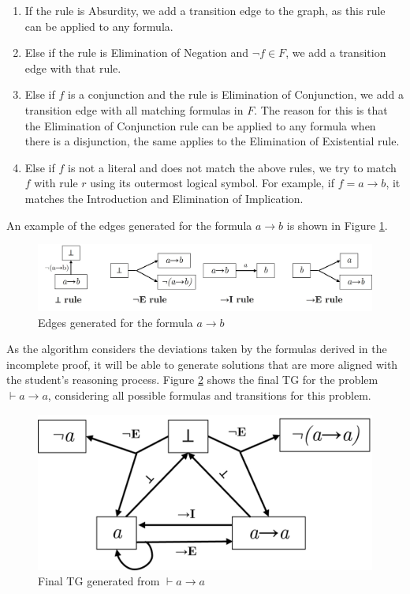 \begin{enumerate}
\begin{enumerate}
            \begin{enumerate}
                \item If the rule is Absurdity, we add a transition edge to the graph, as this rule can be applied to any formula.
                \item Else if the rule is Elimination of Negation and \(\lnot f \in F\), we add a transition edge with that rule.
                \item Else if \(f\) is a conjunction and the rule is Elimination of Conjunction, we add a transition edge with all matching formulas in \(F\). The reason for this is that the Elimination of Conjunction rule can be applied to any formula when there is a disjunction, the same applies to the Elimination of Existential rule.
                \item Else if \(f\) is not a literal and does not match the above rules, we try to match \(f\) with rule \(r\) using its outermost logical symbol. For example, if \(f = a \to b\), it matches the Introduction and Elimination of Implication.
            \end{enumerate}  

            An example of the edges generated for the formula \(a \to b\) is shown in Figure \ref{fig:tg-edges}.
    
            \begin{figure}
                \centering
                \includegraphics[width=1\linewidth]{resources/tg-edges.jpg}
                \caption{Edges generated for the formula \(a \to b\)}
                \label{fig:tg-edges}
            \end{figure}
    \end{enumerate}    

    As the algorithm considers the deviations taken by the formulas derived in the incomplete proof, it will be able to generate solutions that are more aligned with the student’s reasoning process. Figure \ref{fig:tg-final} shows the final TG for the problem \(\vdash a \to a\), considering all possible formulas and transitions for this problem.

    \begin{figure}
        \centering
        \includegraphics[width=0.6\linewidth]{resources/tg-final.png}
        \caption{Final TG generated from \(\vdash a \to a\)}
        \label{fig:tg-final}
    \end{figure}
\end{enumerate}



